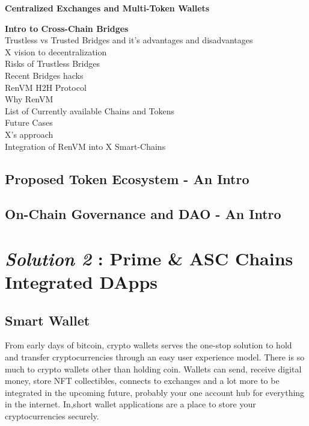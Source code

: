 \documentclass[letterpaper,11pt]{article}
\begin{document}
\textbf{Centralized Exchanges and Multi-Token Wallets}

\textbf{Intro to Cross-Chain Bridges}\\

Trustless vs Trusted Bridges and it's advantages and disadvantages\\

X vision to decentralization\\

Risks of Trustless Bridges\\

Recent Bridges hacks\\

RenVM H2H Protocol\\

Why RenVM\\

List of Currently available Chains and Tokens\\

Future Cases\\

X's approach\\

Integration of RenVM into X Smart-Chains\\


	\subsection{Proposed Token Ecosystem - An Intro}

	\subsection{On-Chain Governance and DAO - An Intro}
	



\section{\textbf{\textit{Solution 2} : Prime \& ASC Chains Integrated DApps}}

\subsection{Smart Wallet}
	
From early days of bitcoin, crypto wallets serves the one-stop solution to hold and transfer cryptocurrencies through an easy user experience model. There is so much to crypto wallets other than holding coin. Wallets can send, receive digital money, store NFT collectibles, connects to exchanges and a lot more to be integrated in the upcoming future, probably your one account hub for everything in the internet. In,short wallet applications are a place to store your cryptocurrencies securely. 
\end{document}
